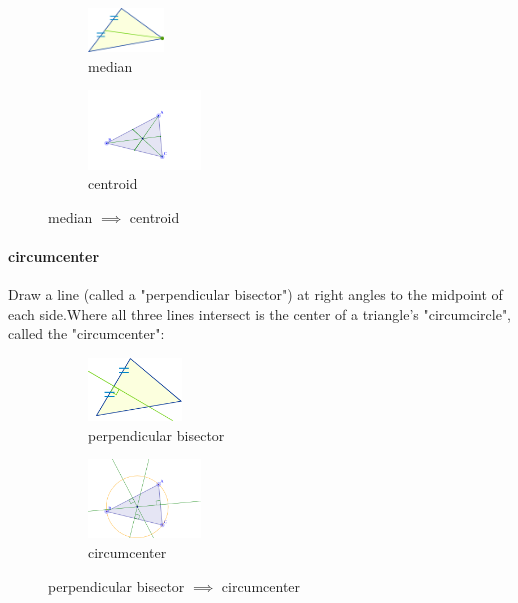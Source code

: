 \begin{figure}[h!]
    \centering
    \begin{subfigure}{2cm}
        \includegraphics[width=2cm]{./public/images/median}
        \caption{median}
    \end{subfigure}
    \begin{subfigure}{3cm}
        \includegraphics[width=3cm]{./public/images/centroid}
        \caption{centroid}
    \end{subfigure}
    \caption{median $\implies$ centroid}
\end{figure}

\paragraph*{circumcenter} Draw a line (called a "perpendicular bisector") at right angles to the midpoint of each side.Where all three lines intersect is the center of a triangle's "circumcircle", called the "circumcenter":

\begin{figure}[h!]
    \centering
    \begin{subfigure}{3cm}
        \includegraphics[width=2.5cm]{./public/images/perpendicular-bisector}
        \caption{perpendicular bisector}
    \end{subfigure}
    \begin{subfigure}{3cm}
        \includegraphics[width=3cm]{./public/images/circumcenter}
        \caption{circumcenter}
    \end{subfigure}
    \caption{perpendicular bisector $\implies$ circumcenter}
\end{figure}


